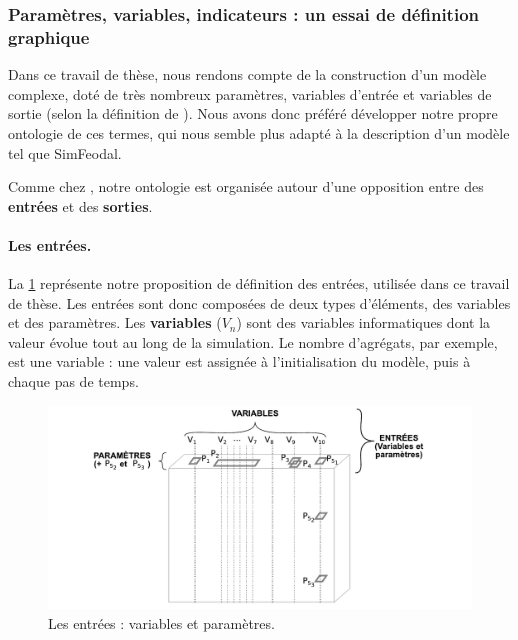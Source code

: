 \subsubsection{Paramètres, variables, indicateurs : un essai de définition graphique}
\label{subsubsec:mes_definitions_params}


Dans ce travail de thèse, nous rendons compte de la construction d'un modèle complexe, doté de très nombreux paramètres, variables d'entrée et variables de sortie (selon la définition de \citeauthor{balci_validation_1994}).
Nous avons donc préféré développer notre propre \og ontologie\fg{} de ces termes, qui nous semble plus adapté à la description d'un modèle tel que SimFeodal.

Comme chez \citeauthor{balci_validation_1994}, notre ontologie est organisée autour d'une opposition entre des \textbf{entrées} et des \textbf{sorties}.

\paragraph{Les entrées.}

La \cref{fig:parametres-these-entrees} représente notre proposition de définition des entrées, utilisée dans ce travail de thèse.
Les entrées sont donc composées de deux types d'éléments, des variables et des paramètres.
Les \textbf{variables} ($V_n$) sont des variables informatiques dont la valeur évolue tout au long de la simulation.
Le nombre d'agrégats, par exemple, est une variable : une valeur est assignée à l'initialisation du modèle, puis à chaque pas de temps.

\begin{figure}[H]
	\includegraphics[width=\linewidth]{img/schemas_params_1_entrees.pdf}
	\caption{Les entrées : variables et paramètres.} 
	\label{fig:parametres-these-entrees} 
\end{figure}

